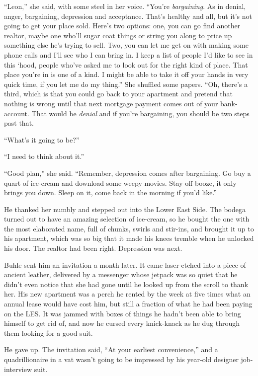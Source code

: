“Leon,” she said, with some steel in her voice. “You're 
\emph{bargaining}. As in denial, anger, bargaining, depression and 
acceptance. That's healthy and all, but it's not going to get your 
place sold. Here's two options: one, you can go find another realtor, 
maybe one who'll sugar coat things or string you along to price up 
something else he's trying to sell. Two, you can let me get on with 
making some phone calls and I'll see who I can bring in. I keep a list 
of people I'd like to see in this `hood, people who've asked me to look 
out for the right kind of place. That place you're in is one of a kind. 
I might be able to take it off your hands in very quick time, if you 
let me do my thing.” She shuffled some papers. “Oh, there's a 
third, which is that you could go back to your apartment and pretend 
that nothing is wrong until that next mortgage payment comes out of 
your bank-account. That would be \emph{denial} and if you're 
bargaining, you should be two steps past that.

“What's it going to be?”

“I need to think about it.”

“Good plan,” she said. “Remember, depression comes after 
bargaining. Go buy a quart of ice-cream and download some weepy movies. 
Stay off booze, it only brings you down. Sleep on it, come back in the 
morning if you'd like.”

He thanked her numbly and stepped out into the Lower East Side. The 
bodega turned out to have an amazing selection of ice-cream, so he 
bought the one with the most elaborated name, full of chunks, swirls 
and stir-ins, and brought it up to his apartment, which was so big that 
it made his knees tremble when he unlocked his door. The realtor had 
been right. Depression was next.

\tb

Buhle sent him an invitation a month later. It came laser-etched into a 
piece of ancient leather, delivered by a messenger whose jetpack was so 
quiet that he didn't even notice that she had gone until he looked up 
from the scroll to thank her. His new apartment was a perch he rented 
by the week at five times what an annual lease would have cost him, but 
still a fraction of what he had been paying on the LES. It was jammed 
with boxes of things he hadn't been able to bring himself to get rid 
of, and now he cursed every knick-knack as he dug through them looking 
for a good suit.

He gave up. The invitation said, “At your earliest convenience,” 
and a quadrillionaire in a vat wasn't going to be impressed by his 
year-old designer job-interview suit.

